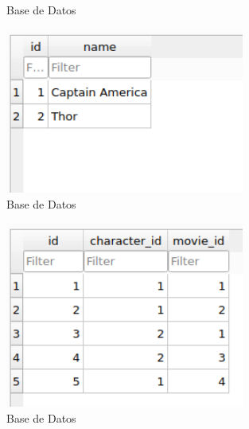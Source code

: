 \documentclass{article}
\begin{document}
\begin{itemize}
\begin{figure}[H]
            \caption{Base de Datos}
        \end{figure}
        \begin{figure}[H]
            \centering
            \includegraphics[width=0.7\textwidth]{img/Cap4.png}
            \caption{Base de Datos}
        \end{figure}
        \begin{figure}[H]
            \centering
            \includegraphics[width=0.7\textwidth]{img/Cap5.png}
            \caption{Base de Datos}
        \end{figure}
    \end{itemize}
\end{document}
